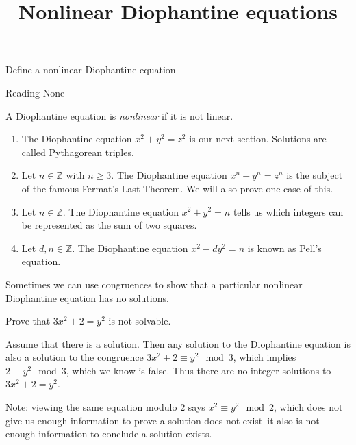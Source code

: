 \documentclass{ximera}
\title{Nonlinear Diophantine equations}
\begin{document}
\begin{abstract}
\end{abstract}
\maketitle

\begin{obj}
    \item Define a nonlinear Diophantine equation
\end{obj}


\begin{pre}
    \item[Reading] None
\end{pre}


\begin{definition}
	A Diophantine equation is \emph{nonlinear} if it is not linear.
\end{definition}
 
\begin{example}
  
	\begin{enumerate}
 		\item The Diophantine equation $x^2+y^2=z^2$ is our next section. Solutions are called Pythagorean triples.
 		\item Let $n\in\mathbb{Z}$ with $n\geq 3$. The Diophantine equation $x^n+y^n=z^n$ is the subject of the famous Fermat's Last Theorem. We will also prove one case of this.
 		\item Let $n\in\mathbb{Z}$. The Diophantine equation $x^2+y^2=n$ tells us which integers can be represented as the sum of two squares.
 		\item Let $d,n\in\mathbb{Z}$. The Diophantine equation $x^2-dy^2=n$ is known as Pell's equation.
	\end{enumerate}
\end{example}
 
Sometimes we can use congruences to show that a particular nonlinear Diophantine equation has no solutions.
 
\begin{example}
	Prove that $3x^2+2=y^2$ is not solvable.

	\begin{solution}
		Assume that there is a solution. Then any solution to the Diophantine equation is also a solution to the congruence $3x^2+2\equiv y^2 \mod 3$, which implies $2\equiv y^2 \mod 3$, which we know is false. Thus there are no integer solutions to $3x^2+2=y^2$.
	\end{solution}
 \end{example}
 
Note: viewing the same equation modulo $2$ says $x^2\equiv y^2 \mod 2$, which does not give us enough information to prove a solution does not exist--it also is not enough information to conclude a solution exists.
 
\end{document}

